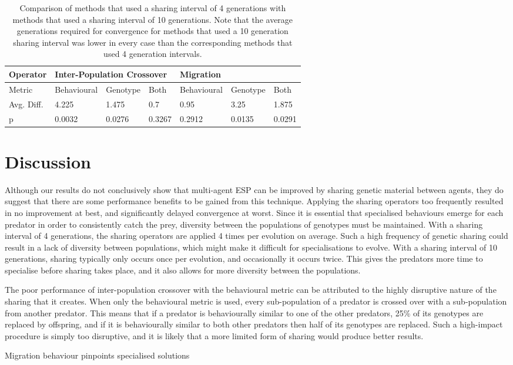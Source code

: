 \documentclass[12pt]{article} %
\begin{document}
\begin{table} \centering
    \begin{tabular}{|l|l|l|l|l|l|l|}
    \hline
    Operator	& \multicolumn{3}{l|}{Inter-Population Crossover} & \multicolumn{3}{l|}{Migration} \\ \hline
    Metric	& Behavioural	& Genotype	& Both	& Behavioural	& Genotype	& Both   \\ \hline
    Avg. Diff.	& 4.225		& 1.475	& 0.7		& 0.95		& 3.25	& 1.875  \\ \hline
    p 		& 0.0032		& 0.0276	& 0.3267	& 0.2912		& 0.0135	& 0.0291 \\ \hline
    \end{tabular}
   \caption{Comparison of methods that used a sharing interval of 4 generations with methods that used a sharing interval of 10 generations. Note that the average generations required for convergence for methods that used a 10 generation sharing interval was lower in every case than the corresponding methods that used 4 generation intervals.}
\end{table}

\section{Discussion}

Although our results do not conclusively show that multi-agent ESP can be improved by sharing genetic material between agents, they do suggest that there are some performance benefits to be gained from this technique. Applying the sharing operators too frequently resulted in no improvement at best, and significantly delayed convergence at worst. Since it is essential that specialised behaviours emerge for each predator in order to consistently catch the prey, diversity between the populations of genotypes must be maintained. With a sharing interval of 4 generations, the sharing operators are applied 4 times per evolution on average. Such a high frequency of genetic sharing could result in a lack of diversity between populations, which might make it difficult for specialisations to evolve. With a sharing interval of 10 generations, sharing typically only occurs once per evolution, and occasionally it occurs twice. This gives the predators more time to specialise before sharing takes place, and it also allows for more diversity between the populations.

The poor performance of inter-population crossover with the behavioural metric can be attributed to the highly disruptive nature of the sharing that it creates. When only the behavioural metric is used, every sub-population of a predator is crossed over with a sub-population from another predator. This means that if a predator is behaviourally similar to one of the other predators, 25\% of its genotypes are replaced by offspring, and if it is behaviourally similar to both other predators then half of its genotypes are replaced. Such a high-impact procedure is simply too disruptive, and it is likely that a more limited form of sharing would produce better results.



Migration behaviour pinpoints specialised solutions

{}

\end{document}
